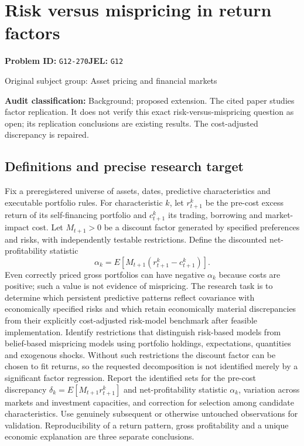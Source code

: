 \documentclass[11pt,a4paper]{article}
\begin{document}
\section*{Risk versus mispricing in return factors}
\textbf{Problem ID:} \texttt{G12-270}\quad \textbf{JEL:} \texttt{G12}\par
\label{problem:OP-0314}
{\sffamily\small\color{muted}Original subject group: Asset pricing and financial markets\par}
\label{definitions:problem:30007596}
\textbf{Audit classification:} Background; proposed extension. The cited paper studies factor replication. It does not verify this exact risk-versus-mispricing question as open; its replication conclusions are existing results. The cost-adjusted discrepancy is repaired.
\subsection*{Definitions and precise research target}
Fix a preregistered universe of assets, dates, predictive characteristics and executable portfolio rules. For characteristic \(k\), let \(r^k_{t+1}\) be the pre-cost excess return of its self-financing portfolio and \(c^k_{t+1}\) its trading, borrowing and market-impact cost. Let \(M_{t+1}>0\) be a discount factor generated by specified preferences and risks, with independently testable restrictions. Define the discounted net-profitability statistic
\[\alpha_k=E[M_{t+1}(r^k_{t+1}-c^k_{t+1})].\]
Even correctly priced gross portfolios can have negative \(\alpha_k\) because costs are positive; such a value is not evidence of mispricing. The research task is to determine which persistent predictive patterns reflect covariance with economically specified risks and which retain economically material discrepancies from their explicitly cost-adjusted risk-model benchmark after feasible implementation. Identify restrictions that distinguish risk-based models from belief-based mispricing models using portfolio holdings, expectations, quantities and exogenous shocks. Without such restrictions the discount factor can be chosen to fit returns, so the requested decomposition is not identified merely by a significant factor regression. Report the identified sets for the pre-cost discrepancy \(\delta_k=E[M_{t+1}r^k_{t+1}]\) and net-profitability statistic \(\alpha_k\), variation across markets and investment capacities, and correction for selection among candidate characteristics. Use genuinely subsequent or otherwise untouched observations for validation. Reproducibility of a return pattern, gross profitability and a unique economic explanation are three separate conclusions.
\end{document}
